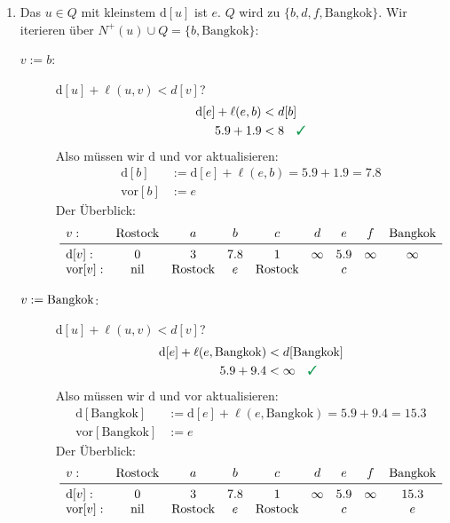 \documentclass[
a4paper, %
11pt,
]
{scrartcl}
\newcommand{\dist}{\text{d}}
\newcommand{\vor}{\text{vor}}
\newcommand{\nil}{\text{nil}}
\begin{document}
\begin{enumerate}
  \item Das $u \in Q$ mit kleinstem $\dist[u]$ ist $e$.
    $Q$ wird zu $\{ b, d, f, \text{Bangkok}\}$.
    Wir iterieren über $N^+(u) \cup Q = \{ b, \text{Bangkok} \}$:
    \begin{description}
      \item[$v := b$:] $\dist[u] + \ell(u, v) < d[v]$?
        \begin{align*}
          \dist[e] + \ell(e, b) & < d[b]\\
          \num{5,9} + \num{1,9} & < \num{8} \quad \richtig
        \end{align*}
        Also müssen wir $\dist$ und $\vor$ aktualisieren:
        \begin{align*}
          \dist[b] & := \dist[e] + \ell(e, b)
            = \num{5,9} + \num{1,9} = \num{7,8}\\
          \vor[b] & := e
        \end{align*}
        Der Überblick:
        \begin{align*}
          \begin{array}{lcccccccc}
            v: & \text{Rostock} & a & b & c & d & e & f & \text{Bangkok}\\
            \midrule
            \dist[v]:
              & 0 & 3 & \num{7,8} & 1 & \infty & \num{5,9} & \infty & \infty\\
            \vor[v]:
              & \nil & \text{Rostock} & e & \text{Rostock} & & c
          \end{array}
        \end{align*}

      \item[$v := \textnormal{Bangkok}$:] $\dist[u] + \ell(u, v) < d[v]$?
        \begin{align*}
          \dist[e] + \ell(e, \text{Bangkok}) & < d[\text{Bangkok}]\\
          \num{5,9} + \num{9,4} & < \infty \quad \richtig
        \end{align*}
        Also müssen wir $\dist$ und $\vor$ aktualisieren:
        \begin{align*}
          \dist[\text{Bangkok}] & := \dist[e] + \ell(e, \text{Bangkok})
            = \num{5,9} + \num{9,4}= \num{15,3}\\
          \vor[\text{Bangkok}] & := e
        \end{align*}
        Der Überblick:
        \begin{align*}
          \begin{array}{lcccccccc}
            v: & \text{Rostock} & a & b & c & d & e & f & \text{Bangkok}\\
            \midrule
            \dist[v]:
              & 0 & 3 & \num{7,8} & 1 & \infty & \num{5,9} & \infty & \num{15,3}\\
            \vor[v]:
              & \nil & \text{Rostock} & e & \text{Rostock} & & c & & e
          \end{array}
        \end{align*}
    \end{description}


\end{enumerate}
\end{document}
